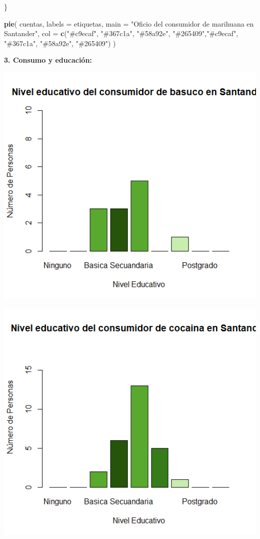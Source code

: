 \documentclass[
]{article}
\newenvironment{Shaded}{\begin{snugshade}}{\end{snugshade}}
\newcommand{\AttributeTok}[1]{\textcolor[rgb]{0.13,0.29,0.53}{#1}}
\newcommand{\FunctionTok}[1]{\textcolor[rgb]{0.13,0.29,0.53}{\textbf{#1}}}
\newcommand{\NormalTok}[1]{#1}
\newcommand{\StringTok}[1]{\textcolor[rgb]{0.31,0.60,0.02}{#1}}
\begin{document}
\begin{Shaded}
\begin{Highlighting}[]
\NormalTok{\}}

\FunctionTok{pie}\NormalTok{(}
\NormalTok{  cuentas,}
  \AttributeTok{labels =}\NormalTok{ etiquetas,}
  \AttributeTok{main =} \StringTok{"Oficio del consumidor de marihuana en Santander"}\NormalTok{,}
  \AttributeTok{col =} \FunctionTok{c}\NormalTok{(}\StringTok{"\#c9ecaf"}\NormalTok{, }\StringTok{"\#367c1a"}\NormalTok{, }\StringTok{"\#58a92e"}\NormalTok{, }\StringTok{"\#265409"}\NormalTok{,}\StringTok{"\#c9ecaf"}\NormalTok{, }\StringTok{"\#367c1a"}\NormalTok{, }\StringTok{"\#58a92e"}\NormalTok{, }\StringTok{"\#265409"}\NormalTok{)}
\NormalTok{)}
\end{Highlighting}
\end{Shaded}

\hfill\break

\textbf{3. Consumo y educación:}

\includegraphics{images/basuco educacion santander.png}

\includegraphics{images/cocaina educacion santander.png}
\end{document}
